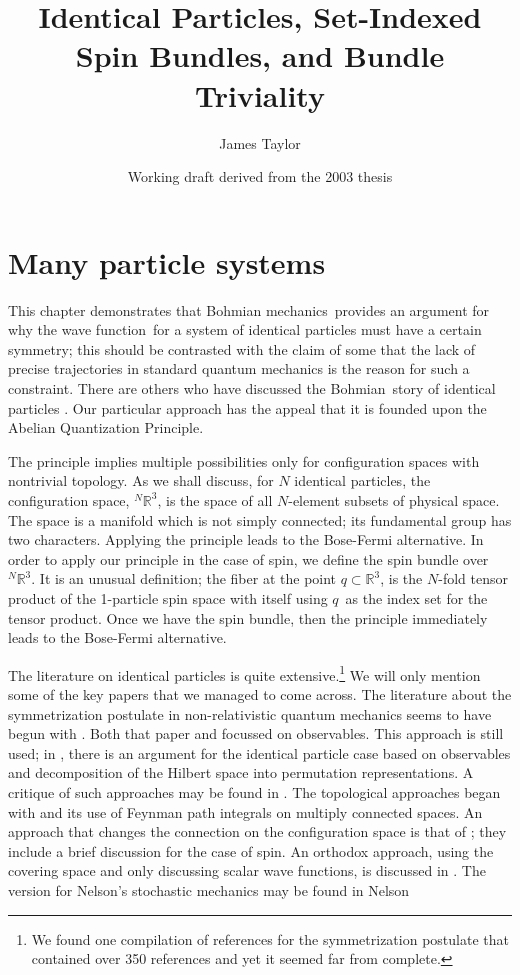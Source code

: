 \documentclass[11pt]{article}
\title{Identical Particles, Set-Indexed Spin Bundles, and Bundle Triviality}
\author{James Taylor}
\date{Working draft derived from the 2003 thesis}
\theoremstyle{remark}
\begin{document}
\maketitle

\section{Many particle systems} \label{c:manpart}


This chapter  
demonstrates that Bohmian mechanics\  provides an argument for why
the wave function\ for a system of identical particles must have a certain symmetry;
this should be contrasted with the claim of some that the lack of precise
trajectories in standard quantum mechanics is the reason for such a
constraint. 
 There are others who have discussed the Bohmian\ story of
identical particles \cite{SC95, S95, BBS99, Bac03}. Our
particular approach has the appeal that it is 
founded upon the Abelian Quantization Principle. 


The principle implies multiple possibilities only for 
configuration spaces with nontrivial topology.
As we shall discuss, for $N$ identical particles, the 
configuration space, \ensuremath{{}^N\ensuremath{\mathbb{R}^{3}}},  is the space of all $N$-element subsets of
physical space. The space is a manifold which is not simply connected;
its fundamental group has two characters. Applying the principle leads
to 
the Bose-Fermi alternative.
In order to
apply our principle in 
the case of spin, we define 
the spin bundle over \ensuremath{{}^N\ensuremath{\mathbb{R}^{3}}}.  It is an
unusual definition;  the fiber at the point $\ensuremath{q} \subset
\ensuremath{\mathbb{R}^{3}}$, is the $N$-fold tensor product of the 1-particle spin
space with itself using
\ensuremath{q}\ as the index set for 
the
tensor product. Once we have the spin bundle, then the principle
immediately leads to the Bose-Fermi alternative. 


The literature on identical particles is quite extensive.\footnote{We found one
compilation of references for the symmetrization postulate that
contained over 350 references and yet it seemed far from complete.}
 We will only mention some of the key papers that we managed to come
across.
The literature about the symmetrization postulate
in non-relativistic quantum mechanics seems to have begun with
\cite{MO64}. Both that paper and \cite{Gir65} focussed on 
observables. This approach is still used; in  \cite{Gal91}, there
is an argument for the identical particle case 
based on observables and decomposition of the Hilbert space into
permutation representations. A critique of such approaches may be
found in \cite{Mir73}. 
The topological approaches began with \cite{DL71} and its use of Feynman path
integrals on 
multiply
connected spaces. 
An approach that changes the connection on the configuration space is
that of \cite{LM77}; they include a brief discussion for the case of spin. 
An orthodox approach, using the covering space and only discussing
scalar wave functions,  
is discussed in \cite{Mor92}.  
The version for
Nelson's stochastic 
mechanics may be found in Nelson 
\cite{Nel85}
\end{document}
